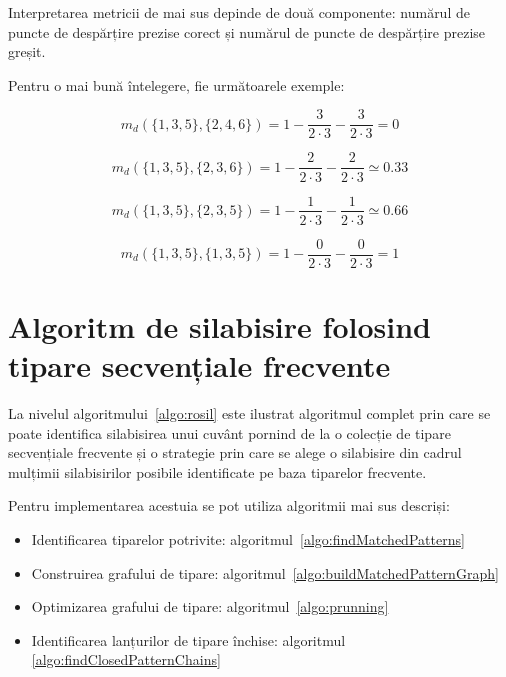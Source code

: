 Interpretarea metricii de mai sus depinde de două componente: numărul de puncte de despărțire prezise corect și numărul de puncte de despărțire prezise greșit.

\begin{ex}
Pentru o mai bună întelegere, fie următoarele exemple:

\begin{equation}
m_d(\{1,3,5\}, \{2,4,6\}) = 1- \frac{3}{2 \cdot 3} - \frac{3}{2 \cdot 3} = 0 
\end{equation}

\begin{equation}
m_d(\{1,3,5\}, \{2,3,6\}) = 1- \frac{2}{2 \cdot 3} - \frac{2}{2 \cdot 3} \simeq 0.33 
\end{equation}

\begin{equation}
m_d(\{1,3,5\}, \{2,3,5\}) = 1- \frac{1}{2 \cdot 3} - \frac{1}{2 \cdot 3} \simeq 0.66 
\end{equation}


\begin{equation}
m_d(\{1,3,5\}, \{1,3,5\}) = 1 - \frac{0}{2 \cdot 3} - \frac{0}{2 \cdot 3} = 1 
\end{equation}


\end{ex} 

\section{Algoritm de silabisire folosind tipare secvențiale frecvente}
La nivelul algoritmului~\ref{algo:rosil} este ilustrat algoritmul complet prin care se poate identifica silabisirea unui cuvânt pornind de la o colecție de tipare secvențiale frecvente și o strategie prin care se alege o silabisire din cadrul mulțimii silabisirilor posibile identificate pe baza tiparelor frecvente.

Pentru implementarea acestuia se pot utiliza algoritmii mai sus descriși:

\begin{itemize}
\item Identificarea tiparelor potrivite: algoritmul~\ref{algo:findMatchedPatterns}
\item Construirea grafului de tipare: algoritmul~\ref{algo:buildMatchedPatternGraph}
\item Optimizarea grafului de tipare: algoritmul~\ref{algo:prunning}
\item Identificarea lanțurilor de tipare închise: algoritmul~ \ref{algo:findClosedPatternChains}
\end{itemize}


